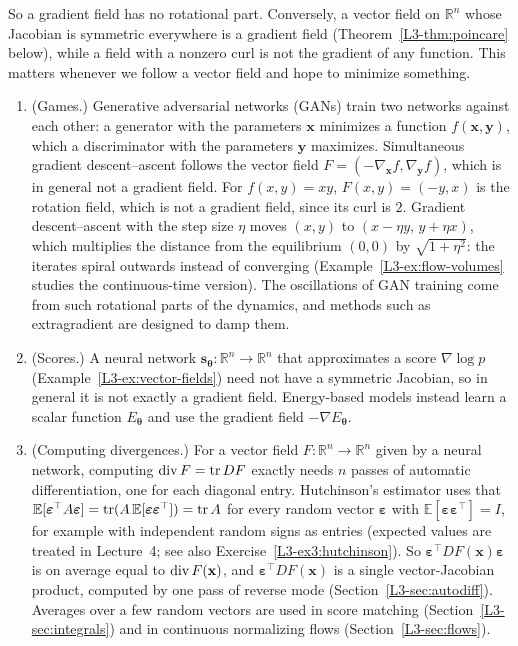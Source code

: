 So a gradient field has no rotational part. Conversely, a vector field on $\mathbb{R}^n$ whose Jacobian is symmetric everywhere is a gradient field (Theorem~\ref{L3-thm:poincare} below), while a field with a nonzero curl is not the gradient of any function. This matters whenever we follow a vector field and hope to minimize something.

\begin{remark}\label{L3-rem:vector-fields-ml}
    \begin{enumerate}
        \item (Games.) Generative adversarial networks (GANs) train two networks against each other: a generator with the parameters $\mathbf{x}$ minimizes a function $f(\mathbf{x}, \mathbf{y})$, which a discriminator with the parameters $\mathbf{y}$ maximizes. Simultaneous gradient descent--ascent follows the vector field $F = (-\nabla_{\mathbf{x}}f, \nabla_{\mathbf{y}}f)$, which is in general not a gradient field. For $f(x, y) = xy$, $F(x, y) = (-y, x)$ is the rotation field, which is not a gradient field, since its curl is $2$. Gradient descent--ascent with the step size $\eta$ moves $(x, y)$ to $(x - \eta y, \, y + \eta x)$, which multiplies the distance from the equilibrium $(0, 0)$ by $\sqrt{1 + \eta^2}$: the iterates spiral outwards instead of converging (Example~\ref{L3-ex:flow-volumes} studies the continuous-time version). The oscillations of GAN training come from such rotational parts of the dynamics, and methods such as extragradient are designed to damp them.
        \item (Scores.) A neural network $\mathbf{s}_{\boldsymbol{\theta}}: \mathbb{R}^n \to \mathbb{R}^n$ that approximates a score $\nabla\log p$ (Example~\ref{L3-ex:vector-fields}) need not have a symmetric Jacobian, so in general it is not exactly a gradient field. Energy-based models instead learn a scalar function $E_{\boldsymbol{\theta}}$ and use the gradient field $-\nabla E_{\boldsymbol{\theta}}$.
        \item (Computing divergences.) For a vector field $F: \mathbb{R}^n \to \mathbb{R}^n$ given by a neural network, computing $\operatorname{div} F = \operatorname{tr} DF$ exactly needs $n$ passes of automatic differentiation, one for each diagonal entry. Hutchinson's estimator uses that $\mathbb{E}[\boldsymbol{\varepsilon}^\top A\boldsymbol{\varepsilon}] = \operatorname{tr}(A\,\mathbb{E}[\boldsymbol{\varepsilon}\boldsymbol{\varepsilon}^\top]) = \operatorname{tr} A$ for every random vector $\boldsymbol{\varepsilon}$ with $\mathbb{E}[\boldsymbol{\varepsilon}\boldsymbol{\varepsilon}^\top] = I$, for example with independent random signs as entries (expected values are treated in Lecture~4; see also Exercise~\ref{L3-ex3:hutchinson}). So $\boldsymbol{\varepsilon}^\top DF(\mathbf{x})\boldsymbol{\varepsilon}$ is on average equal to $\operatorname{div} F(\mathbf{x})$, and $\boldsymbol{\varepsilon}^\top DF(\mathbf{x})$ is a single vector-Jacobian product, computed by one pass of reverse mode (Section~\ref{L3-sec:autodiff}). Averages over a few random vectors are used in score matching (Section~\ref{L3-sec:integrals}) and in continuous normalizing flows (Section~\ref{L3-sec:flows}).
    \end{enumerate}
\end{remark}

